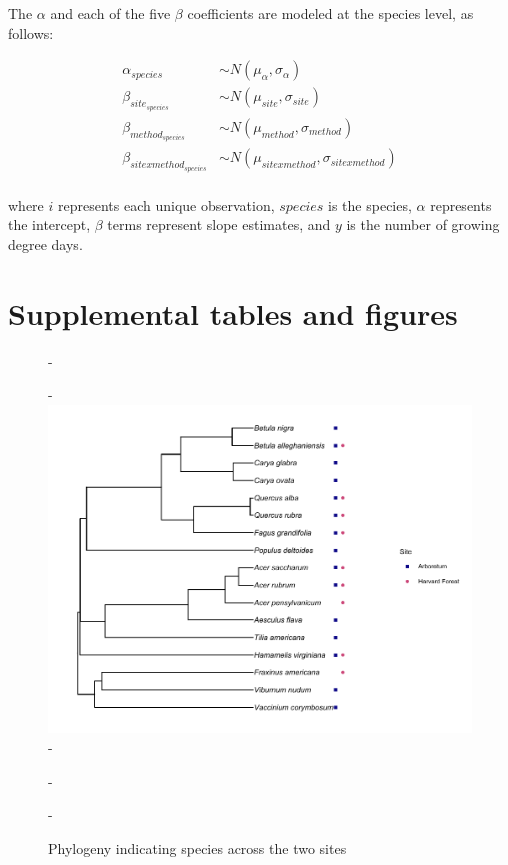 \documentclass{article}\usepackage[]{graphicx}\usepackage[]{color}
\begin{document}
The $\alpha$ and each of the five $\beta$ coefficients are modeled at the species level, as follows:

\begin{align*}
\alpha_{species} & \sim N(\mu_{\alpha}, \sigma_{\alpha}) \\
\beta_{site_{species}} & \sim N(\mu_{site}, \sigma_{site}) \\
\beta_{method_{species}} & \sim N(\mu_{method}, \sigma_{method}) \\
\beta_{sitexmethod_{species}} & \sim N(\mu_{sitexmethod}, \sigma_{sitexmethod}) \\
\end{align*}

where $i$ represents each unique observation, $species$ is the species, $\alpha$ represents the intercept, $\beta$ terms represent slope estimates, and $y$ is the number of growing degree days. 




\section*{Supplemental tables and figures}

{\begin{figure} [H]
  -\begin{center}
  -\includegraphics[width=12cm]{..//phylodata/microtree_hfandts.pdf}
  -\caption{Phylogeny indicating species across the two sites}\label{fig:phylo}
  -\end{center}
  -\end{figure}}
\end{document}
